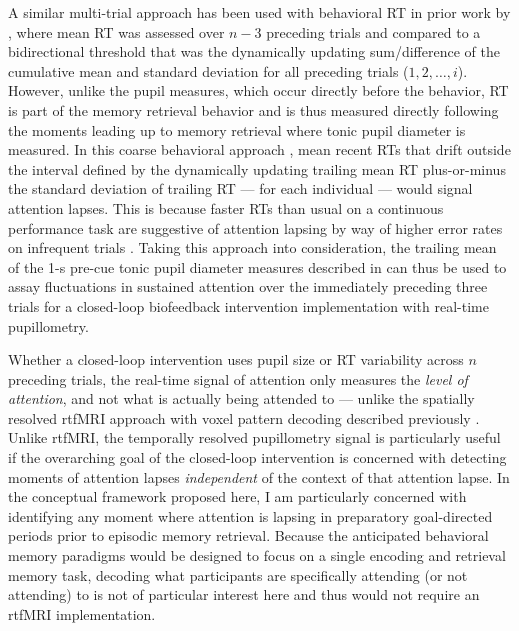 A similar multi-trial approach has been used with behavioral RT in prior work by \textcite{debettencourt2019realtime}, where mean RT was assessed over $n - 3$ preceding trials and compared to a bidirectional threshold that was the dynamically updating sum/difference of the cumulative mean and standard deviation for all preceding trials ($1, 2, \ldots, i$). However, unlike the pupil measures, which occur directly before the behavior, RT is part of the memory retrieval behavior and is thus measured directly following the moments leading up to memory retrieval where tonic pupil diameter is measured. In this coarse behavioral approach \parencite{debettencourt2019realtime}, mean recent RTs that drift outside the interval defined by the dynamically updating trailing mean RT plus-or-minus the standard deviation of trailing RT --- for each individual --- would signal attention lapses. This is because faster RTs than usual on a continuous performance task \parencite{debettencourt2015closed,debettencourt2018forgetting,robertson1997oops,rosenberg2013sustaining} are suggestive of attention lapsing by way of higher error rates on infrequent trials \parencite{debettencourt2015closed,debettencourt2018forgetting,esterman2013zone}. Taking this approach into consideration, the trailing mean of the 1-s pre-cue tonic pupil diameter measures described in \textcite{madore2020memory} can thus be used to assay fluctuations in sustained attention over the immediately preceding three trials for a closed-loop biofeedback intervention implementation with real-time pupillometry.

Whether a closed-loop intervention uses pupil size or RT variability across $n$ preceding trials, the real-time signal of attention only measures the \emph{level of attention}, and not what is actually being attended to --- unlike the spatially resolved rtfMRI approach with voxel pattern decoding described previously \parencite{debettencourt2015closed,debettencourt2019realtime,rosenberg2013sustaining,yoss1970pupil}. Unlike rtfMRI, the temporally resolved pupillometry signal is particularly useful if the overarching goal of the closed-loop intervention is concerned with detecting moments of attention lapses \emph{independent} of the context of that attention lapse. In the conceptual framework proposed here, I am particularly concerned with identifying any moment where attention is lapsing in preparatory goal-directed periods prior to episodic memory retrieval. Because the anticipated behavioral memory paradigms would be designed to focus on a single encoding and retrieval memory task, decoding what participants are specifically attending (or not attending) to is not of particular interest here and thus would not require an rtfMRI implementation.

